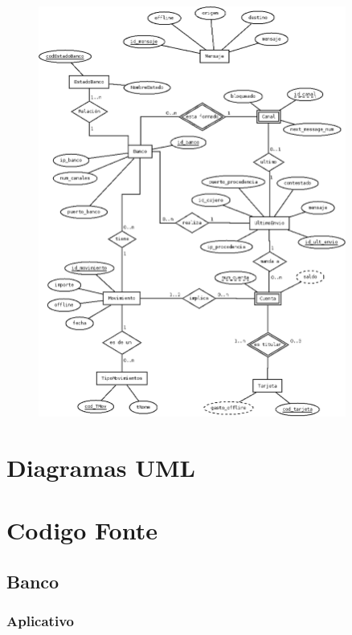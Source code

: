 \documentclass[a4paper,titlepage]{article}
\begin{document}
\begin{figure}[h!]
  \begin{center}
    \includegraphics[width=0.9\textwidth]{diagrama_bd_consorcio.png}
  \end{center}
\end{figure}



\clearpage
\newpage

\section {Diagramas UML}

\clearpage
\newpage

\section {Codigo Fonte}
\subsection{Banco}
\subsubsection{Aplicativo}

\end{document}
